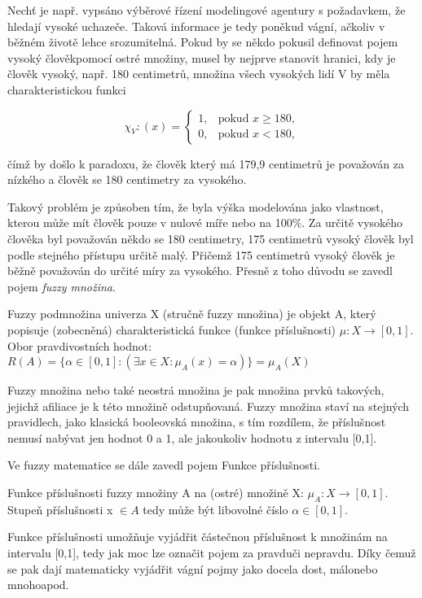Nech\v t je např. vypsáno výběrové řízení modelingové agentury s požadavkem, že hledají vysoké uchazeče. Taková informace je tedy poněkud vágní, ačkoliv v běžném životě lehce srozumitelná. Pokud by se někdo pokusil definovat pojem \clqq vysoký člověk\crqq \space pomocí ostré množiny, musel by nejprve stanovit hranici, kdy je člověk vysoký, např. 180 centimetr\r u, množina všech vysokých lidí V by měla charakteristickou funkci

    $$\chi_V:(x)=\begin{cases} 1, & \mbox{pokud }  x \geq 180,\\    0, & \mbox{pokud } x < 180,  \end{cases}$$

    čímž by došlo k paradoxu, že člověk který má 179,9 centimetr\r u je považován za nízkého a člověk se 180 centimetry za vysokého.

    Takový problém je zp\r usoben tím, že byla výška modelována jako vlastnost, kterou m\r uže mít člověk pouze v nulové míře nebo na 100\%. Za určitě vysokého člověka byl považován někdo se 180 centimetry, 175 centimetr\r u vysoký člověk byl podle stejného přístupu určitě malý. Přičemž 175 centimetr\r u vysoký člověk je běžně považován do určité míry za vysokého. Přesně z toho d\r uvodu se zavedl pojem \textit{fuzzy množina}. 
    \begin{definition}
    \cite{navara}
        Fuzzy podmnožina univerza X (stručně fuzzy množina) je objekt A, který popisuje (zobecněná) charakteristická funkce (funkce příslušnosti) $\mu: X \rightarrow [0,1]$. Obor pravdivostních hodnot: $R(A) = \{\alpha \in [0,1]: (\exists x \in X : \mu_A(x) = \alpha)\} = \mu_A(X)$
    \end{definition}
    Fuzzy množina nebo také neostrá množina je pak množina prvků takových, jejichž afiliace je k této množině odstupňovaná. Fuzzy množina staví na stejných pravidlech, jako klasická booleovská množina, s tím rozdílem, že příslušnost nemusí nabývat jen hodnot 0 a 1, ale jakoukoliv hodnotu z intervalu [0,1].
    
    Ve fuzzy matematice se dále zavedl pojem Funkce příslušnosti.
    \begin{definition}
        \cite{Kolo} Funkce příslušnosti fuzzy množiny A na (ostré) množině X: $\mu_A : X \rightarrow  [0,1].$ Stupe\v n příslušnosti x $\in A$ tedy m\r uže být libovolné číslo $\alpha \in [0,1]$.
    \end{definition}
    Funkce příslušnosti umož\v nuje vyjádřit částečnou příslušnost k množinám na intervalu [0,1], tedy jak moc lze označit pojem za \clqq pravdu\crqq \space či \clqq nepravdu\crqq. Díky čemuž se pak dají matematicky vyjádřit vágní pojmy jako \clqq docela dost\crqq, \clqq málo\crqq \space nebo \clqq mnoho\crqq \space apod.

